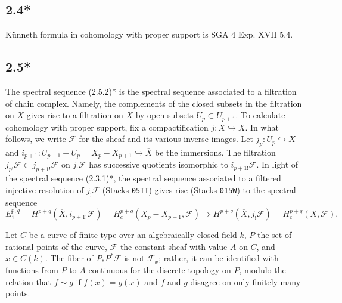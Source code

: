 \documentclass[deligne.tex]{subfiles}
\begin{document}
\subsection*{2.4*} Künneth formula in cohomology with proper support is
SGA 4 Exp. XVII 5.4.

\subsection*{2.5*} The spectral sequence (2.5.2)* is the spectral sequence
associated to a filtration of chain complex. Namely, the complements of the 
closed subsets in the filtration on $X$ gives rise to a filtration on $X$
by open subsets $U_p\subset U_{p+1}$.
To calculate cohomology with proper support, fix a compactification
$j:X\hookrightarrow\overline X$.
In what follows, we write $\mathscr F$ for the sheaf and its various
inverse images. Let $j_p:U_p\hookrightarrow\overline X$ and
$i_{p+1}:U_{p+1}-U_p=X_p-X_{p+1}\hookrightarrow\overline X$ be the immersions. The filtration $j_{p!}\mathscr F\subset j_{p+1!}\mathscr F$ on
$j_!\mathscr F$ has successive quotients isomorphic to $i_{p+1!}\mathscr F$.
In light of the spectral sequence (2.3.1)*, the spectral sequence associated
to a filtered injective resolution of $j_!\mathscr F$
(\href{https://stacks.math.columbia.edu/tag/05TT}{Stacks \texttt{05TT}})
gives rise 
(\href{https://stacks.math.columbia.edu/tag/015W}{Stacks \texttt{015W}})
to the spectral sequence
\begin{equation*}
	E_1^{p,q}=H^{p+q}(\overline X,i_{p+1!}\mathscr F)
	=H_c^{p+q}(X_p-X_{p+1},\mathscr F)
	\Rightarrow H^{p+q}(\overline X,j_!\mathscr F)=H_c^{p+q}(X,\mathscr F).
\end{equation*}

\begin{remark}
Let $C$ be a curve of finite type over an algebraically closed field $k$, 
$P$ the set of rational points of the curve, $\mathscr F$ the constant sheaf
with value $A$ on $C$, and $x\in C(k)$.
The fiber of $P_*P^*\mathscr F$ is not $\mathscr F_x$;
rather, it can be identified with functions from $P$ to $A$ continuous for
the discrete topology on $P$, modulo the relation that $f\sim g$ if
$f(x)=g(x)$ and $f$ and $g$ disagree on only finitely many points.
\end{remark}
\end{document}
